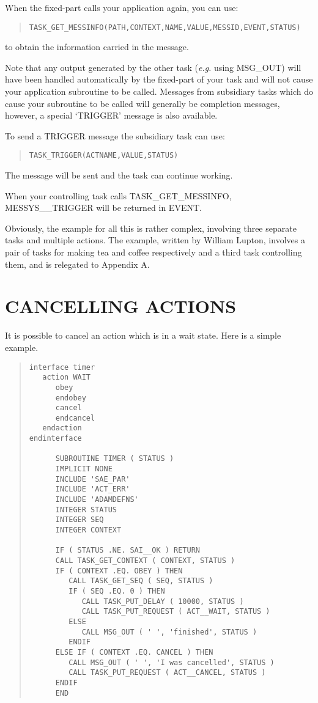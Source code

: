 When the fixed-part calls your application again, you can use:
\small \begin{quote} \begin{verbatim}
TASK_GET_MESSINFO(PATH,CONTEXT,NAME,VALUE,MESSID,EVENT,STATUS) 
\end{verbatim} \end{quote} \normalsize
to obtain the information carried in the message. 

Note that any output generated by the other task ({\em e.g.} using MSG\_OUT) 
will have been handled automatically by the fixed-part of your task and will 
not cause your application subroutine to be called.
Messages from subsidiary tasks which do cause your subroutine to be called 
will generally be completion messages, however, a special `TRIGGER' message is
also available.

To send a TRIGGER message the subsidiary task can use:
\small \begin{quote} \begin{verbatim}
TASK_TRIGGER(ACTNAME,VALUE,STATUS)
\end{verbatim} \end{quote} \normalsize
The message will be sent and the task can continue working.

When your controlling task calls TASK\_GET\_MESSINFO, MESSYS\_\_TRIGGER will
be returned in EVENT.

Obviously, the example for all this is rather complex, involving three 
separate tasks and multiple actions. The example, written by William 
Lupton, involves a pair of tasks for making tea and coffee respectively 
and a third task controlling them, and is relegated to Appendix A.


\section{CANCELLING ACTIONS}

It is possible to cancel an action which is in a wait state. Here is a 
simple example.

\small \begin{quote} \begin{verbatim}
interface timer
   action WAIT
      obey
      endobey
      cancel
      endcancel
   endaction
endinterface

      SUBROUTINE TIMER ( STATUS )
      IMPLICIT NONE
      INCLUDE 'SAE_PAR'
      INCLUDE 'ACT_ERR'
      INCLUDE 'ADAMDEFNS'
      INTEGER STATUS
      INTEGER SEQ
      INTEGER CONTEXT

      IF ( STATUS .NE. SAI__OK ) RETURN
      CALL TASK_GET_CONTEXT ( CONTEXT, STATUS )
      IF ( CONTEXT .EQ. OBEY ) THEN
         CALL TASK_GET_SEQ ( SEQ, STATUS )
         IF ( SEQ .EQ. 0 ) THEN
            CALL TASK_PUT_DELAY ( 10000, STATUS )
            CALL TASK_PUT_REQUEST ( ACT__WAIT, STATUS )
         ELSE
            CALL MSG_OUT ( ' ', 'finished', STATUS )
         ENDIF
      ELSE IF ( CONTEXT .EQ. CANCEL ) THEN
         CALL MSG_OUT ( ' ', 'I was cancelled', STATUS )
         CALL TASK_PUT_REQUEST ( ACT__CANCEL, STATUS )
      ENDIF
      END
\end{verbatim} \end{quote} \normalsize

